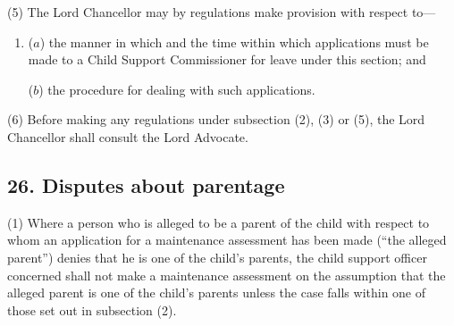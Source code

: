 \documentclass[12pt,a4paper]{article}
\begin{document}
(5) The Lord Chancellor may by regulations make provision with respect to—
\begin{enumerate}\item[]
($a$) the manner in which and the time within which applications must be made to a Child Support Commissioner for leave under this section; and

($b$) the procedure for dealing with such applications.
\end{enumerate}

(6) Before making any regulations under subsection (2), (3)  or (5), the Lord Chancellor shall consult the Lord Advocate.


\subsection{26. Disputes about parentage}

(1) Where a person who is alleged to be a parent of the child with respect to whom an application for a maintenance assessment has been made (“the alleged parent”) denies that he is one of the child’s parents, 
the child support officer concerned 
shall not make a maintenance assessment on the assumption that the alleged parent is one of the child’s parents unless the case falls within one of those set out in subsection (2).
\end{document}
